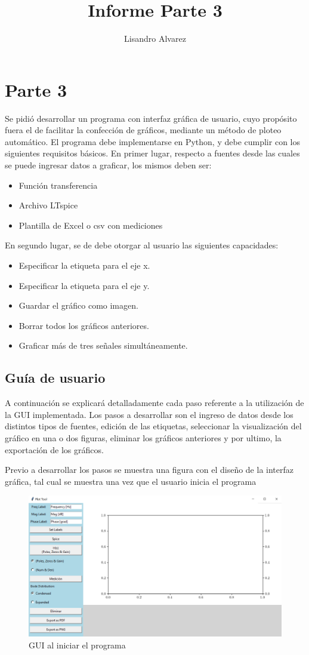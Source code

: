 \documentclass[10pt,a4paper]{article}
\author{Lisandro Alvarez}
\title{Informe Parte 3}
\begin{document}
\section{Parte 3}
Se pidió desarrollar un programa con interfaz gráfica de usuario, cuyo propósito fuera el de facilitar la confección de gráficos, mediante un método de ploteo automático. El programa debe implementarse en Python, y debe cumplir con los siguientes requisitos básicos. 
En primer lugar, respecto a fuentes desde las cuales se puede ingresar datos a graficar, los mismos deben ser:
\begin{itemize}
\item Función transferencia
\item Archivo LTspice
\item Plantilla de Excel o csv con mediciones
\end{itemize}
En segundo lugar, se de debe otorgar al usuario las siguientes capacidades:
\begin{itemize}
\item Especificar la etiqueta para el eje x.
\item Especificar la etiqueta para el eje y.
\item Guardar el gráfico como imagen.
\item Borrar todos los gráficos anteriores.
\item Graficar más de tres señales simultáneamente.
\end{itemize}

\subsection{Guía de usuario}
A continuación se explicará detalladamente cada paso referente a la utilización de la GUI implementada. Los pasos a desarrollar son el ingreso de datos desde los distintos tipos de fuentes, edición de las etiquetas, seleccionar la visualización del gráfico en una o dos figuras, eliminar los gráficos anteriores y por ultimo, la exportación de los gráficos.

Previo a desarrollar los pasos se muestra una figura con el diseño de la interfaz gráfica, tal cual se muestra una vez que el usuario inicia el programa

\begin{figure}[ht]
\centering
\includegraphics[scale=0.2]{window.png}
\caption{GUI al iniciar el programa}
\label{fig:window}
\end{figure}
\end{document}
